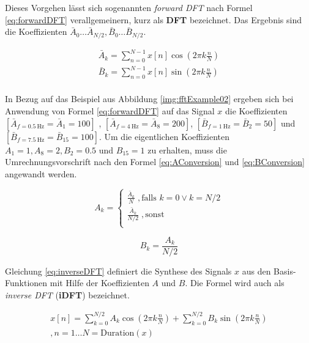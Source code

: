 Dieses Vorgehen lässt sich sogenannten \emph{forward DFT} nach Formel \ref{eq:forwardDFT} verallgemeinern, kurz als \textbf{DFT} bezeichnet. Das Ergebnis sind die Koeffizienten $\bar{A}_0 \ldots \bar{A}_{N/2}, \bar{B}_0 \ldots \bar{B}_{N/2}$. \cite[S. 158]{dspGuide}

\begin{equation}
\begin{split}
\bar{A}_k = \sum_{n=0}^{N-1}x[n] \cos(2\pi k \frac{n}{N}) \\
\bar{B}_k = \sum_{n=0}^{N-1}x[n] \sin(2\pi k \frac{n}{N}) \\
\end{split}
\label{eq:forwardDFT}
\end{equation}

In Bezug auf das Beispiel aus Abbildung \ref{img:fftExample02} ergeben sich bei Anwendung von Formel \ref{eq:forwardDFT} auf das Signal $x$ die Koeffizienten $[ \bar{A}_{f=\SI{0.5}{\hertz}} = \bar{A}_{1} = 100 ]$ , $[  \bar{A}_{f=\SI{4}{\hertz}} = \bar{A}_{8} = 200 ]$, $[ \bar{B}_{f=\SI{1}{\hertz}} = \bar{B}_{2} = 50 ]$ und $[ \bar{B}_{f=\SI{7.5}{\hertz}} = \bar{B}_{15} = 100 ]$. Um die eigentlichen Koeffizienten $A_1 = 1, A_8 = 2, B_2 = 0.5$ und $B_{15} = 1$ zu erhalten, muss die Umrechnungsvorschrift nach den Formel \ref{eq:AConversion} und \ref{eq:BConversion} angewandt werden. \cite[S. 152 - 153]{dspGuide}

\begin{equation}
A_k = 
\begin{cases}
\frac{\bar{A}_k}{N} \; , \text{falls } k = 0 \vee k = N/2\\
\frac{\bar{A}_k}{N/2} \; ,\text{sonst} \\
\end{cases}
\label{eq:AConversion}
\end{equation}

\begin{equation}
B_k= \frac{A_k}{N/2}
\label{eq:BConversion}
\end{equation}

Gleichung \ref{eq:inverseDFT} definiert die Synthese des Signals $x$ aus den Basis-Funktionen mit Hilfe der Koeffizienten $A$ und $B$. Die Formel wird auch als \emph{inverse DFT} (\textbf{iDFT}) bezeichnet. \cite[S. 152 - 153]{dspGuide}

\begin{equation}
\begin{split}
x[n] = \sum_{k = 0}^{N/2} A_k\cos(2\pi k \frac{n}{N}) + \sum_{k = 0}^{N/2}B_k\sin(2\pi k \frac{n}{N}) \\
,n = 1 \ldots N = \text{Duration}(x)
\end{split}
\label{eq:inverseDFT}
\end{equation}

